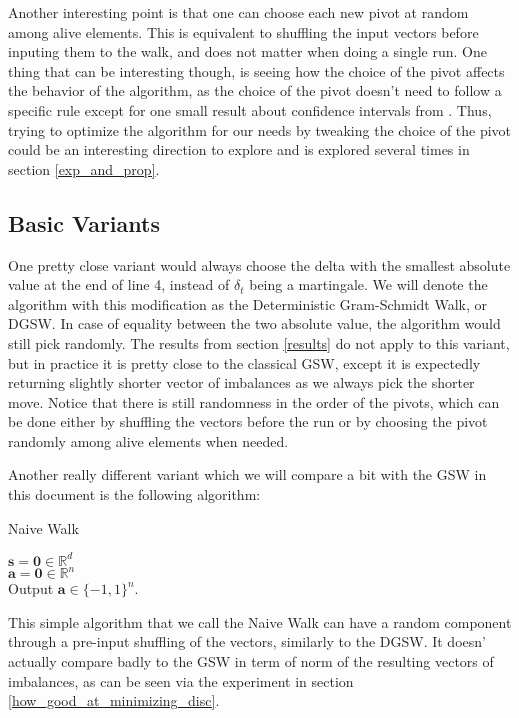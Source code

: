 \documentclass[12pt]{article}
\begin{document}
Another interesting point is that one can choose each new pivot at random among alive elements. This is equivalent to shuffling the input vectors before inputing them to the walk, and does not matter when doing a single run. One thing that can be interesting though, is seeing how the choice of the pivot affects the behavior of the algorithm, as the choice of the pivot doesn't need to follow a specific rule except for one small result about confidence intervals from \cite{harshaw2019balancing}. Thus, trying to optimize the algorithm for our needs by tweaking the choice of the pivot could be an interesting direction to explore and is explored several times in section \ref{exp_and_prop}.

\subsection{Basic Variants}\label{basic_variants}
One pretty close variant would always choose the delta with the smallest absolute value at the end of line 4, instead of $\delta_t$ being a martingale. We will denote the algorithm with this modification as the Deterministic Gram-Schmidt Walk, or DGSW. In case of equality between the two absolute value, the algorithm would still pick randomly. The results from section \ref{results} do not apply to this variant, but in practice it is pretty close to the classical GSW, except it is expectedly returning slightly shorter vector of imbalances as we always pick the shorter move. Notice that there is still randomness in the order of the pivots, which can be done either by shuffling the vectors before the run or by choosing the pivot randomly among alive elements when needed.

Another really different variant which we will compare a bit with the GSW in this document is the following algorithm:

\begin{algorithm}[H]\label{naivewalk}
{\fontsize{10}{12}
\caption{Naive Walk}
   $\textbf{s}=\textbf{0}\in\mathbb{R}^d$\\
   $\textbf{a}=\textbf{0}\in\mathbb{R}^n$\\
    Output $\textbf{a}\in\{-1,1\}^n$.
    }%
    \end{algorithm}
This simple algorithm that we call the Naive Walk can have a random component through a pre-input shuffling of the vectors, similarly to the DGSW. It doesn' actually compare badly to the GSW in term of norm of the resulting vectors of imbalances, as can be seen via the experiment in section \ref{how_good_at_minimizing_disc}. 
\end{document}
